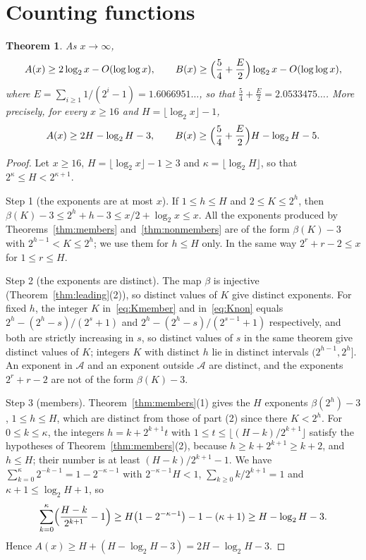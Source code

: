 \documentclass[11pt]{amsart}
\newtheorem{Theorem}{Theorem}[section]
\theoremstyle{definition}
\begin{document}
\section{Counting functions}
\label{sec:counting}
\begin{Theorem}
\label{thm:counting}
As $x\to\infty$,
\[
A(x)\ge2\log_2x-O(\log\log x),\qquad B(x)\ge\Bigl(\frac54+\frac E2\Bigr)\log_2x-O(\log\log x),
\]
where $E=\sum_{i\ge1}1/(2^i-1)=1.6066951\ldots$, so that $\frac54+\frac E2=2.0533475\ldots$. More precisely, for every $x\ge16$ and $H=\lfloor\log_2x\rfloor-1$,
\[
A(x)\ge2H-\log_2H-3,\qquad B(x)\ge\Bigl(\frac54+\frac E2\Bigr)H-\log_2H-5.
\]
\end{Theorem}
\begin{proof}
Let $x\ge16$, $H=\lfloor\log_2x\rfloor-1\ge3$ and $\kappa=\lfloor\log_2H\rfloor$, so that $2^\kappa\le H<2^{\kappa+1}$.

Step 1 (the exponents are at most $x$). If $1\le h\le H$ and $2\le K\le2^h$, then $\beta(K)-3\le2^h+h-3\le x/2+\log_2x\le x$. All the exponents produced by Theorems~\ref{thm:members} and~\ref{thm:nonmembers} are of the form $\beta(K)-3$ with $2^{h-1}<K\le2^h$; we use them for $h\le H$ only. In the same way $2^r+r-2\le x$ for $1\le r\le H$.

Step 2 (the exponents are distinct). The map $\beta$ is injective (Theorem~\ref{thm:leading}(2)), so distinct values of $K$ give distinct exponents. For fixed $h$, the integer $K$ in~\eqref{eq:Kmember} and in~\eqref{eq:Knon} equals $2^h-(2^h-s)/(2^s+1)$ and $2^h-(2^h-s)/(2^{s-1}+1)$ respectively, and both are strictly increasing in $s$, so distinct values of $s$ in the same theorem give distinct values of $K$; integers $K$ with distinct $h$ lie in distinct intervals $(2^{h-1},2^h]$. An exponent in $\mathcal{A}$ and an exponent outside $\mathcal{A}$ are distinct, and the exponents $2^r+r-2$ are not of the form $\beta(K)-3$.

Step 3 (members). Theorem~\ref{thm:members}(1) gives the $H$ exponents $\beta(2^h)-3$, $1\le h\le H$, which are distinct from those of part (2) since there $K<2^h$. For $0\le k\le\kappa$, the integers $h=k+2^{k+1}t$ with $1\le t\le\lfloor(H-k)/2^{k+1}\rfloor$ satisfy the hypotheses of Theorem~\ref{thm:members}(2), because $h\ge k+2^{k+1}\ge k+2$, and $h\le H$; their number is at least $(H-k)/2^{k+1}-1$. We have $\sum_{k=0}^{\kappa}2^{-k-1}=1-2^{-\kappa-1}$ with $2^{-\kappa-1}H<1$, $\sum_{k\ge0}k/2^{k+1}=1$ and $\kappa+1\le\log_2H+1$, so
\[
\sum_{k=0}^{\kappa}\Bigl(\frac{H-k}{2^{k+1}}-1\Bigr)\ge H\bigl(1-2^{-\kappa-1}\bigr)-1-(\kappa+1)\ge H-\log_2H-3.
\]
Hence $A(x)\ge H+(H-\log_2H-3)=2H-\log_2H-3$.


\end{proof}
\end{document}
